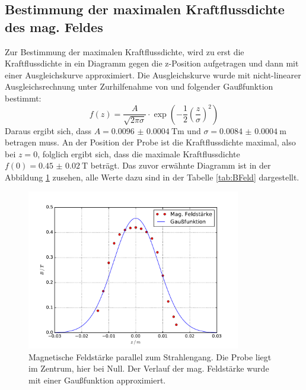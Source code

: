 \subsection{Bestimmung der maximalen Kraftflussdichte des mag. Feldes}
\label{sec:BFeld}
Zur Bestimmung der maximalen Kraftflussdichte, wird zu erst die Kraftflussdichte in ein 
Diagramm gegen die z-Position aufgetragen und dann mit einer Ausgleichskurve approximiert. 
Die Ausgleichskurve wurde mit nicht-linearer Ausgleichsrechnung unter Zurhilfenahme von 
\cite{scipy} und folgender Gaußfunktion bestimmt: 
\begin{equation*}
	f(z)= \frac{A}{\sqrt{2\pi\sigma}}\cdot\exp\left(-\frac{1}{2} \left(\frac{z}{\sigma} \right) ^2 \right)
\end{equation*} 
Daraus ergibt sich, dass $A= \SI{0.0096(4)}{\tesla\meter}$ und $\sigma = \SI{0.0084(4)}{\meter}$ 
betragen muss. An der Position der Probe ist die Kraftflussdichte maximal, also bei 
$z =0$, folglich ergibt sich, dass  die maximale Kraftflussdichte $f(0) = \SI{0.45(2)}{\tesla}$ 
beträgt. Das zuvor erwähnte Diagramm ist in der Abbildung \ref{fig:BFeld} zusehen, alle Werte 
dazu sind in der Tabelle \ref{tab:BFeld} dargestellt.
 \begin{figure}
   \centering
   \includegraphics[height= 7cm]{plots/BFeld.pdf}
   \caption{Magnetische Feldstärke parallel zum Strahlengang. Die Probe liegt im Zentrum, hier bei Null. Der Verlauf der mag. Feldstärke wurde mit einer Gaußfunktion approximiert.}
   \label{fig:BFeld}
 \end{figure}

